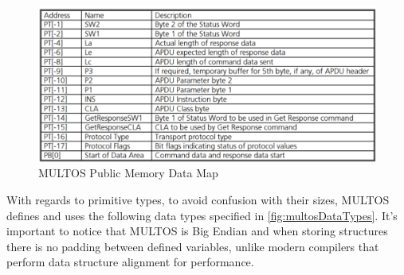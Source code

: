 \begin{figure}[bth]
	\begin{center}
		\includegraphics[width=\linewidth]{gfx/multosPubMem}
	\end{center}
	\caption{MULTOS Public Memory Data Map}
	\label{fig:multosPubMem}
\end{figure}


\hfil


With regards to primitive types, to avoid confusion with their sizes, MULTOS defines and uses the following data types specified in \autoref{fig:multosDataTypes}. It's important to notice that MULTOS is Big Endian
and when storing structures there is no padding between defined variables, unlike modern compilers that perform data structure alignment \citep{dataStructAlign} for performance.

